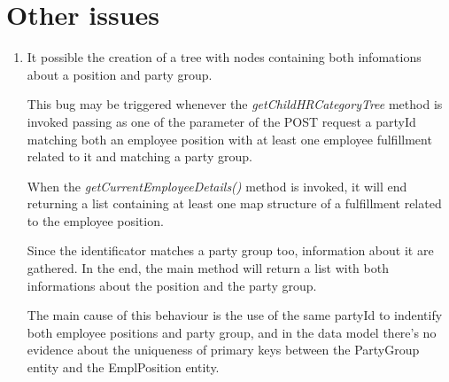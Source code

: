 \section{Other issues}

\begin{enumerate}
	\item It possible the creation of a tree with nodes containing both infomations about a position and party group.

This bug may be triggered whenever the \textit{getChildHRCategoryTree} method is invoked passing as one of the parameter of the POST request a partyId matching both an employee position with at least one employee fulfillment related to it and matching a party group.

When the \textit{getCurrentEmployeeDetails()} method is invoked, it will end returning a list containing at least one map structure of a fulfillment related to the employee position.

Since the identificator matches a party group too, information about it are gathered.
In the end, the main method will return a list with both informations about the position and the party group.

The main cause of this behaviour is the use of the same partyId to indentify both employee positions and party group, and in the data model there's no evidence about the uniqueness of primary keys between the PartyGroup entity and the EmplPosition entity. 
\end{enumerate}

